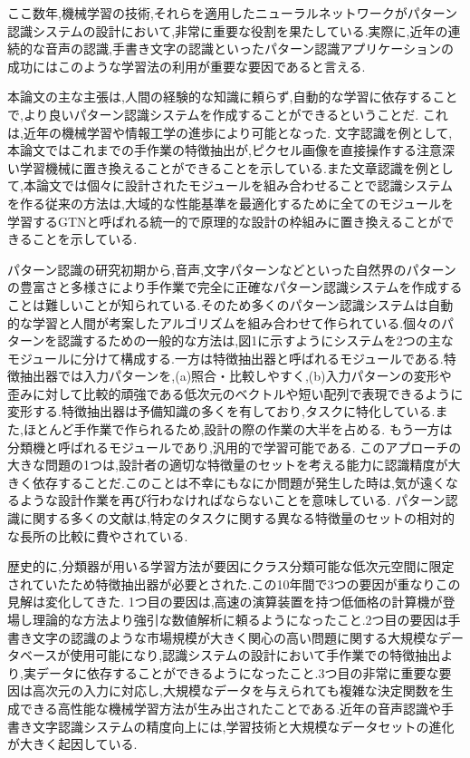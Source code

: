 \documentclass[twocolumn]{jarticle}     %
\begin{document}
ここ数年,機械学習の技術,それらを適用したニューラルネットワークがパターン認識システムの設計において,非常に重要な役割を果たしている.実際に,近年の連続的な音声の認識,手書き文字の認識といったパターン認識アプリケーションの成功にはこのような学習法の利用が重要な要因であると言える.\par
本論文の主な主張は,人間の経験的な知識に頼らず,自動的な学習に依存することで,より良いパターン認識システムを作成することができるということだ.
これは,近年の機械学習や情報工学の進歩により可能となった.
文字認識を例として,本論文ではこれまでの手作業の特徴抽出が,ピクセル画像を直接操作する注意深い学習機械に置き換えることができることを示している.また文章認識を例として,本論文では個々に設計されたモジュールを組み合わせることで認識システムを作る従来の方法は,大域的な性能基準を最適化するために全てのモジュールを学習するGTNと呼ばれる統一的で原理的な設計の枠組みに置き換えることができることを示している.
\par
パターン認識の研究初期から,音声,文字パターンなどといった自然界のパターンの豊富さと多様さにより手作業で完全に正確なパターン認識システムを作成することは難しいことが知られている.そのため多くのパターン認識システムは自動的な学習と人間が考案したアルゴリズムを組み合わせて作られている.個々のパターンを認識するための一般的な方法は,図1に示すようにシステムを2つの主なモジュールに分けて構成する.一方は特徴抽出器と呼ばれるモジュールである.特徴抽出器では入力パターンを,(a)照合・比較しやすく,(b)入力パターンの変形や歪みに対して比較的頑強である低次元のベクトルや短い配列で表現できるように変形する.特徴抽出器は予備知識の多くを有しており,タスクに特化している.また,ほとんど手作業で作られるため,設計の際の作業の大半を占める.
もう一方は分類機と呼ばれるモジュールであり,汎用的で学習可能である.
このアプローチの大きな問題の1つは,設計者の適切な特徴量のセットを考える能力に認識精度が大きく依存することだ.このことは不幸にもなにか問題が発生した時は,気が遠くなるような設計作業を再び行わなければならないことを意味している.
パターン認識に関する多くの文献は,特定のタスクに関する異なる特徴量のセットの相対的な長所の比較に費やされている.\par
歴史的に,分類器が用いる学習方法が要因にクラス分類可能な低次元空間に限定されていたため特徴抽出器が必要とされた\cite{1}.この10年間で3つの要因が重なりこの見解は変化してきた.
1つ目の要因は,高速の演算装置を持つ低価格の計算機が登場し理論的な方法より強引な数値解析に頼るようになったこと.2つ目の要因は手書き文字の認識のような市場規模が大きく関心の高い問題に関する大規模なデータベースが使用可能になり,認識システムの設計において手作業での特徴抽出より,実データに依存することができるようになったこと.3つ目の非常に重要な要因は高次元の入力に対応し,大規模なデータを与えられても複雑な決定関数を生成できる高性能な機械学習方法が生み出されたことである.近年の音声認識や手書き文字認識システムの精度向上には,学習技術と大規模なデータセットの進化が大きく起因している.
\end{document}
